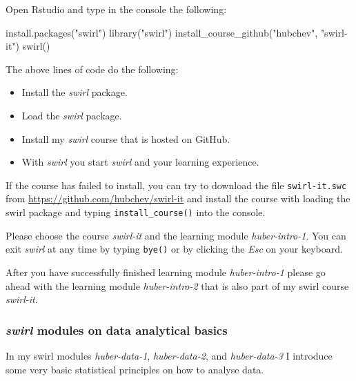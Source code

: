 \documentclass[
  12pt,
  oneside]{book}
\newenvironment{Shaded}{\begin{snugshade}}{\end{snugshade}}
\newcommand{\FunctionTok}[1]{\textcolor[rgb]{0.00,0.00,0.00}{#1}}
\newcommand{\NormalTok}[1]{#1}
\newcommand{\StringTok}[1]{\textcolor[rgb]{0.31,0.60,0.02}{#1}}
\providecommand{\tightlist}{%
  \setlength{\itemsep}{0pt}\setlength{\parskip}{0pt}}
\theoremstyle{definition}
\theoremstyle{definition}
\theoremstyle{definition}
\theoremstyle{definition}
\theoremstyle{remark}
\begin{document}
Open Rstudio and type in the console the following:

\begin{Shaded}
\begin{Highlighting}[]
\FunctionTok{install.packages}\NormalTok{(}\StringTok{"swirl"}\NormalTok{)}
\FunctionTok{library}\NormalTok{(}\StringTok{"swirl"}\NormalTok{)}
\FunctionTok{install\_course\_github}\NormalTok{(}\StringTok{"hubchev"}\NormalTok{, }\StringTok{"swirl{-}it"}\NormalTok{)}
\FunctionTok{swirl}\NormalTok{()}
\end{Highlighting}
\end{Shaded}

The above lines of code do the following:

\begin{itemize}
\tightlist
\item
  Install the \emph{swirl} package.
\item
  Load the \emph{swirl} package.
\item
  Install my \emph{swirl} course that is hosted on GitHub.
\item
  With \emph{swirl} you start \emph{swirl} and your learning experience.
\end{itemize}

If the course has failed to install, you can try to download the file \texttt{swirl-it.swc} from \url{https://github.com/hubchev/swirl-it} and install the course with loading the swirl package and typing \texttt{install\_course()} into the console.

Please choose the course \emph{swirl-it} and the learning module \emph{huber-intro-1}.
You can exit \emph{swirl} at any time by typing \texttt{bye()} or by clicking the \emph{Esc} on your keyboard.

After you have successfully finished learning module \emph{huber-intro-1} please go ahead with the learning module \emph{huber-intro-2} that is also part of my swirl course \emph{swirl-it}.

\hypertarget{swirl-modules-on-data-analytical-basics}{%
\subsubsection*{\texorpdfstring{\emph{swirl} modules on data analytical basics}{swirl modules on data analytical basics}}\label{swirl-modules-on-data-analytical-basics}}

In my swirl modules \emph{huber-data-1}, \emph{huber-data-2}, and \emph{huber-data-3} I introduce some very basic statistical principles on how to analyse data.
\end{document}
